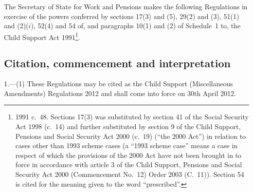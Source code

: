 \documentclass[12pt,a4paper]{article}
\title{\regstitle}
\author{S.I.\ 2012 No.\ 712}
\date{Made
5th March 2012\\
Laid before Parliament
8th March 2012\\
Coming into~force
30th April 2012
}
\begin{document}
\maketitle

\noindent
The Secretary of State for Work and Pensions makes the following Regulations in exercise of the powers conferred by sections 17(3) and (5), 29(2) and (3), 51(1) and (2)($i$), 52(4) and 54 of, and paragraphs 10(1) and (2) of Schedule~1 to, the Child Support Act 1991\footnote{1991 c.~48. Sections 17(3) was substituted by section 41 of the Social Security Act 1998 (c.~14) and further substituted by section 9 of the Child Support, Pensions and Social Security Act 2000 (c.~19) (“the 2000 Act”) in relation to cases other than 1993 scheme cases (a “1993 scheme case” means a case in respect of which the provisions of the 2000 Act have not been brought in to force in accordance with article 3 of the Child Support, Pensions and Social Security Act 2000 (Commencement No.~12) Order 2003 (C.~11)). Section 54 is cited for the meaning given to the word “prescribed”.}. 

{\sloppy

\tableofcontents

}

\bigskip

\setcounter{secnumdepth}{-2}

\subsection[1. Citation, commencement and interpretation]{Citation, commencement and interpretation}

1.---(1)  These Regulations may be cited as the Child Support (Miscellaneous Amendments) Regulations 2012 and shall come into force on 30th April 2012.
\end{document}
